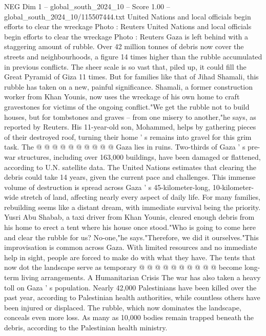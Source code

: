 \begin{textsample}{NEG Dim 1 – global\_south\_2024\_10 – Score 1.00 – global\_south\_2024\_10/115507444.txt}  \label{ex:f1_neg_434}
United Nations and local officials begin efforts to clear the wreckage Photo : Reuters United Nations and local officials begin efforts to clear the wreckage Photo : Reuters Gaza is left behind with a staggering amount of rubble.
Over 42 million tonnes of debris now cover the streets and neighbourhoods, a figure 14 times higher than the rubble accumulated in previous conflicts.
The sheer scale is so vast that, piled up, it could fill the Great Pyramid of Giza 11 times.
But for families like that of Jihad Shamali, this rubble has taken on a new, painful significance.
Shamali, a former construction worker from Khan Younis, now uses the wreckage of his own home to craft gravestones for victims of the ongoing conflict."We get the rubble not to build houses, but for tombstones and graves -- from one misery to another,"he says, as reported by Reuters.
His 11-year-old son, Mohammed, helps by gathering pieces of their destroyed roof, turning their home ' s remains into gravel for this grim task.
The @ @ @ @ @ @ @ @ @ @ Gaza lies in ruins.
Two-thirds of Gaza ' s pre-war structures, including over 163,000 buildings, have been damaged or flattened, according to U.N. satellite data.
The United Nations estimates that clearing the debris could take 14 years, given the current pace and challenges.
This immense volume of destruction is spread across Gaza ' s 45-kilometer-long, 10-kilometer-wide stretch of land, affecting nearly every aspect of daily life.
For many families, rebuilding seems like a distant dream, with immediate survival being the priority.
Yusri Abu Shabab, a taxi driver from Khan Younis, cleared enough debris from his home to erect a tent where his house once stood."Who is going to come here and clear the rubble for us?
No-one,"he says."Therefore, we did it ourselves."This improvisation is common across Gaza.
With limited resources and no immediate help in sight, people are forced to make do with what they have.
The tents that now dot the landscape serve as temporary @ @ @ @ @ @ @ @ @ @ become long-term living arrangements.
A Humanitarian Crisis The war has also taken a heavy toll on Gaza ' s population.
Nearly 42,000 Palestinians have been killed over the past year, according to Palestinian health authorities, while countless others have been injured or displaced.
The rubble, which now dominates the landscape, conceals even more loss.
As many as 10,000 bodies remain trapped beneath the debris, according to the Palestinian health ministry.

\end{textsample}
